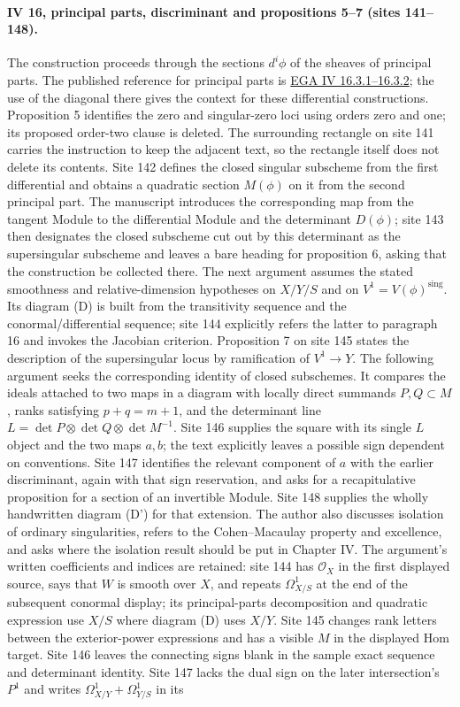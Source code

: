 \paragraph{IV 16, principal parts, discriminant and propositions 5--7 (sites 141--148).}
The construction proceeds through the sections $d^i\phi$ of the sheaves of principal parts. The published reference for principal parts is \href{https://www.numdam.org/articles/10.1007/BF02732123/}{EGA IV 16.3.1--16.3.2}; the use of the diagonal there gives the context for these differential constructions. Proposition 5 identifies the zero and singular-zero loci using orders zero and one; its proposed order-two clause is deleted. The surrounding rectangle on site 141 carries the instruction to keep the adjacent text, so the rectangle itself does not delete its contents. Site 142 defines the closed singular subscheme from the first differential and obtains a quadratic section $M(\phi)$ on it from the second principal part. The manuscript introduces the corresponding map from the tangent Module to the differential Module and the determinant $D(\phi)$; site 143 then designates the closed subscheme cut out by this determinant as the supersingular subscheme and leaves a bare heading for proposition 6, asking that the construction be collected there. The next argument assumes the stated smoothness and relative-dimension hypotheses on $X/Y/S$ and on $V^1=V(\phi)^{\mathrm{sing}}$. Its diagram (D) is built from the transitivity sequence and the conormal/differential sequence; site 144 explicitly refers the latter to paragraph 16 and invokes the Jacobian criterion. Proposition 7 on site 145 states the description of the supersingular locus by ramification of $V^1\longrightarrow Y$. The following argument seeks the corresponding identity of closed subschemes. It compares the ideals attached to two maps in a diagram with locally direct summands $P,Q\subset M$, ranks satisfying $p+q=m+1$, and the determinant line $L=\det P\otimes\det Q\otimes\det M^{-1}$. Site 146 supplies the square with its single $L$ object and the two maps $a,b$; the text explicitly leaves a possible sign dependent on conventions. Site 147 identifies the relevant component of $a$ with the earlier discriminant, again with that sign reservation, and asks for a recapitulative proposition for a section of an invertible Module. Site 148 supplies the wholly handwritten diagram (D') for that extension. The author also discusses isolation of ordinary singularities, refers to the Cohen--Macaulay property and excellence, and asks where the isolation result should be put in Chapter IV. The argument's written coefficients and indices are retained: site 144 has $\mathcal O_X$ in the first displayed source, says that $W$ is smooth over $X$, and repeats $\Omega^1_{X/S}$ at the end of the subsequent conormal display; its principal-parts decomposition and quadratic expression use $X/S$ where diagram (D) uses $X/Y$. Site 145 changes rank letters between the exterior-power expressions and has a visible $M$ in the displayed Hom target. Site 146 leaves the connecting signs blank in the sample exact sequence and determinant identity. Site 147 lacks the dual sign on the later intersection's $P^1$ and writes $\Omega^1_{X/Y}+\Omega^1_{Y/S}$ in its 